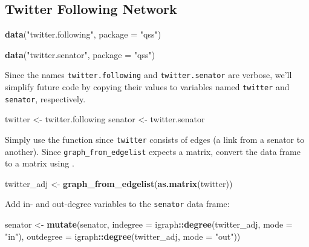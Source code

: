 \documentclass[]{book}
\newenvironment{Shaded}{\begin{snugshade}}{\end{snugshade}}
\newcommand{\KeywordTok}[1]{\textcolor[rgb]{0.13,0.29,0.53}{\textbf{#1}}}
\newcommand{\DataTypeTok}[1]{\textcolor[rgb]{0.13,0.29,0.53}{#1}}
\newcommand{\StringTok}[1]{\textcolor[rgb]{0.31,0.60,0.02}{#1}}
\newcommand{\OperatorTok}[1]{\textcolor[rgb]{0.81,0.36,0.00}{\textbf{#1}}}
\newcommand{\NormalTok}[1]{#1}
\theoremstyle{definition}
\theoremstyle{definition}
\theoremstyle{definition}
\theoremstyle{remark}
\begin{document}
\subsection{Twitter Following Network}\label{twitter-following-network}

\begin{Shaded}
\begin{Highlighting}[]
\KeywordTok{data}\NormalTok{(}\StringTok{"twitter.following"}\NormalTok{, }\DataTypeTok{package =} \StringTok{"qss"}\NormalTok{)}
\end{Highlighting}
\end{Shaded}

\begin{Shaded}
\begin{Highlighting}[]
\KeywordTok{data}\NormalTok{(}\StringTok{"twitter.senator"}\NormalTok{, }\DataTypeTok{package =} \StringTok{"qss"}\NormalTok{)}
\end{Highlighting}
\end{Shaded}

Since the names \texttt{twitter.following} and \texttt{twitter.senator}
are verbose, we'll simplify future code by copying their values to
variables named \texttt{twitter} and \texttt{senator}, respectively.

\begin{Shaded}
\begin{Highlighting}[]
\NormalTok{twitter <-}\StringTok{ }\NormalTok{twitter.following}
\NormalTok{senator <-}\StringTok{ }\NormalTok{twitter.senator}
\end{Highlighting}
\end{Shaded}

Simply use the function since \texttt{twitter} consists of edges (a link
from a senator to another). Since \texttt{graph\_from\_edgelist} expects
a matrix, convert the data frame to a matrix using .

\begin{Shaded}
\begin{Highlighting}[]
\NormalTok{twitter_adj <-}\StringTok{ }\KeywordTok{graph_from_edgelist}\NormalTok{(}\KeywordTok{as.matrix}\NormalTok{(twitter))}
\end{Highlighting}
\end{Shaded}

Add in- and out-degree variables to the \texttt{senator} data frame:

\begin{Shaded}
\begin{Highlighting}[]
\NormalTok{senator <-}
\StringTok{  }\KeywordTok{mutate}\NormalTok{(senator,}
         \DataTypeTok{indegree =}\NormalTok{ igraph}\OperatorTok{::}\KeywordTok{degree}\NormalTok{(twitter_adj, }\DataTypeTok{mode =} \StringTok{"in"}\NormalTok{),}
         \DataTypeTok{outdegree =}\NormalTok{ igraph}\OperatorTok{::}\KeywordTok{degree}\NormalTok{(twitter_adj, }\DataTypeTok{mode =} \StringTok{"out"}\NormalTok{))}
\end{Highlighting}
\end{Shaded}
\end{document}
